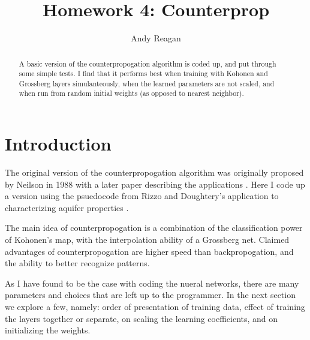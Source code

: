 \documentclass[pre,twocolumn,twoside,byrevtex,superscriptaddress]{revtex4}
\begin{document}




\title{\vspace{-2cm}Homework 4: Counterprop}
\author{Andy Reagan}

\begin{abstract}
A basic version of the counterpropogation algorithm is coded up, and put through some simple tests.
I find that it performs best when training with Kohonen and Grossberg layers simulanteously, when the learned parameters are not scaled, and when run from random initial weights (as opposed to nearest neighbor).
\end{abstract}

\maketitle





\section{Introduction}

The original version of the counterpropogation algorithm was originally proposed by Neilson in 1988 \cite{hecht1987counterpropagation} with a later paper describing the applications \cite{hecht1988applications}.
Here I code up a version using the psuedocode from Rizzo and Doughtery's application to characterizing aquifer properties \cite{rizzo1994characterization}.

The main idea of counterpropogation is a combination of the classification power of Kohonen's map, with the interpolation ability of a Grossberg net.
Claimed advantages of counterpropogation are higher speed than backpropogation, and the ability to better recognize patterns.

As I have found to be the case with coding the nueral networks, there are many parameters and choices that are left up to the programmer.
In the next section we explore a few, namely: order of presentation of training data, effect of training the layers together or separate, on scaling the learning coefficients, and on initializing the weights.
\end{document}
